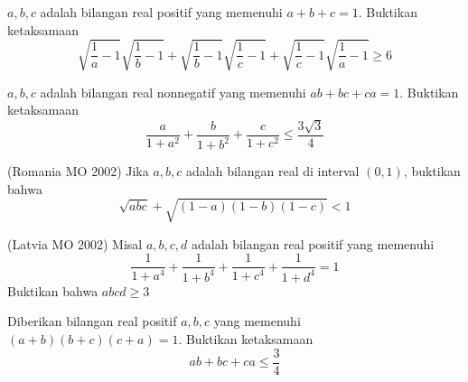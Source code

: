 \documentclass[11pt]{scrartcl}
\begin{document}
\begin{problem}
    $a, b, c$ adalah bilangan real positif yang memenuhi $a + b + c = 1$. Buktikan ketaksamaan \[\sqrt{\dfrac{1}{a} - 1}\sqrt{\dfrac{1}{b} - 1} + \sqrt{\dfrac{1}{b} - 1}\sqrt{\dfrac{1}{c} - 1} + \sqrt{\dfrac{1}{c} - 1}\sqrt{\dfrac{1}{a} - 1} \geq 6\]
\end{problem}

\begin{problem}
    $a, b, c$ adalah bilangan real nonnegatif yang memenuhi $ab + bc + ca = 1$. Buktikan ketaksamaan \[\dfrac{a}{1 + a^2} + \dfrac{b}{1 + b^2} + \dfrac{c}{1 + c^2} \leq \dfrac{3\sqrt{3}}{4}\]
\end{problem}


\begin{problem}
    (Romania MO 2002) Jika $a, b, c$ adalah bilangan real di interval $(0, 1)$, buktikan bahwa \[\sqrt{abc} + \sqrt{(1 - a)(1 - b)(1 - c)} < 1\]
\end{problem}

\begin{problem}
    (Latvia MO 2002) Misal $a, b, c, d$ adalah bilangan real positif yang memenuhi \[\dfrac{1}{1 + a^4} + \dfrac{1}{1 + b^4} + \dfrac{1}{1 + c^4} + \dfrac{1}{1 + d^4} = 1\] Buktikan bahwa $abcd \geq 3$
\end{problem}

\begin{problem}
    Diberikan bilangan real positif $a, b, c$ yang memenuhi $(a + b)(b + c)(c + a) = 1$. Buktikan ketaksamaan \[ab + bc + ca \leq \dfrac{3}{4}\]
\end{problem}
\end{document}
